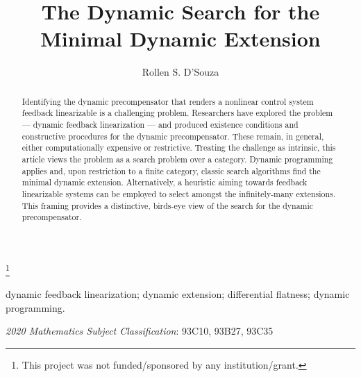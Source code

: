 \documentclass[a4paper]{ifacconf}
\begin{document}
\begin{frontmatter}

\title{The Dynamic Search for the Minimal Dynamic Extension}
\thanks[footnoteinfo]{This project was not funded/sponsored by any institution/grant.}
\author[First]{Rollen S. D'Souza} 
\address[First]{e-mail: research@rollends.ca.}

\begin{abstract}
  Identifying the dynamic precompensator that renders a nonlinear control system feedback linearizable is a challenging problem.
  Researchers have explored the problem --- dynamic feedback linearization --- and produced existence conditions and constructive procedures for the dynamic precompensator.
  These remain, in general, either computationally expensive or restrictive.
  Treating the challenge as intrinsic, this article views the problem as a search problem over a category.
  Dynamic programming applies and, upon restriction to a finite category, classic search algorithms find the minimal dynamic extension.
  Alternatively, a heuristic aiming towards feedback linearizable systems can be employed to select amongst the infinitely-many extensions.
  This framing provides a distinctive, birds-eye view of the search for the dynamic precompensator.
\end{abstract}

\begin{keyword}
  dynamic feedback linearization; dynamic extension; differential flatness; dynamic programming.\\
  \vfill

  \emph{2020 Mathematics Subject Classification}: 93C10, 93B27, 93C35
\end{keyword}

\end{frontmatter}
\end{document}
